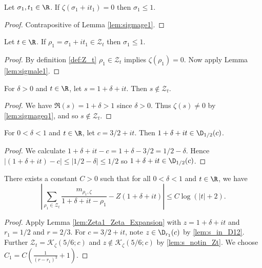 \begin{lemma}\label{lem:sigmale1}  \leanok
Let $\sigma_1,t_1\in\R$.  If $\zeta(\sigma_1 + it_1) = 0$ then $\sigma_1\le 1$.
\end{lemma}
\begin{proof} \leanok {}
Contrapositive of Lemma \ref{lem:sigmage1}.
\end{proof}


\begin{lemma}\label{lem:sigmale1Zt}  \leanok
Let $t\in\R$. If $\rho_1=\sigma_1+it_1\in \mathcal Z_t$ then $\sigma_1\le 1$.
\end{lemma}
\begin{proof} \leanok {}
By definition \ref{def:Z_t} $\rho_1\in \mathcal Z_t$ implies $\zeta(\rho_1)=0$. Now apply Lemma \ref{lem:sigmale1}.
\end{proof}


\begin{lemma}\label{lem:s_notin_Zt}  \leanok
For $\delta>0$ and $t\in\R$, let $s=1+\delta+it$. Then $s\notin \mathcal Z_t$.
\end{lemma}
\begin{proof} 
\leanok
We have $\Re(s)=1+\delta>1$ since $\delta>0$. Thus $\zeta(s)\neq0$ by \cref{lem:sigmageq1}, and so $s\notin \mathcal Z_t$.
\end{proof}

\begin{lemma}\label{lem:s_in_D12}  \leanok
For $0<\delta<1$ and $t\in\R$, let $c=3/2+it$. Then $1+\delta+it\in \mathcal \D_{1/2}(c)$.
\end{lemma}
\begin{proof}
\leanok
We calculate $1+\delta+it - c = 1+\delta - 3/2 = 1/2-\delta$. Hence $|(1+\delta+it) - c| \le |1/2-\delta| \le 1/2$ so $1+\delta+it\in \mathcal \D_{1/2}(c)$.
\end{proof}

\begin{lemma}\label{lem:explicit1deltat}  \leanok
There exists a constant $C>0$ such that for all $0<\delta<1$ and $t\in\R$, we have
\[ \left| \sum_{\rho_1\in \mathcal Z_t} \frac{m_{\rho_1,\zeta}}{1+\delta+it-\rho_1} - Z(1+\delta+it)\right| \le C\log(|t|+2).\]
\end{lemma}
\begin{proof}
\leanok
Apply Lemma \ref{lem:Zeta1_Zeta_Expansion} with $z=1+\delta+it$ and $r_1=1/2$ and $r=2/3$. For $c = 3/2+it$, note $z\in \D_{r_1}(c)$ by \cref{lem:s_in_D12}. Further $\mathcal Z_t = \mathcal K_\zeta(5/6;c)$ and $z\notin \mathcal K_\zeta(5/6;c)$ by \cref{lem:s_notin_Zt}.
We choose $C_1=C(\frac{1}{(r-r_1)^3}+1)$.
\end{proof}

